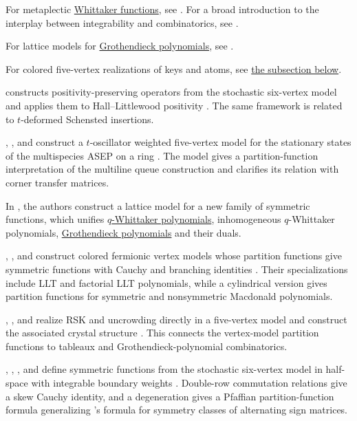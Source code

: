 For metaplectic \hyperref[whittaker]{Whittaker functions}, see
\cite{BrubakerBuciumasBumpGustafsson2020}.
For a broad introduction to the interplay between integrability and
combinatorics, see \cite{ZinnJustin2024x}.

For lattice models for \hyperref[grothendieck]{Grothendieck polynomials}, see
\cite{BrubakerFrechetteHardtTiborWeber2020x,BuciumasScrimshaw2020x}.

For colored five-vertex realizations of keys and atoms, see
\hyperref[latticeModelDemazure]{the subsection below}.

 constructs positivity-preserving operators from the
stochastic six-vertex model and applies them to Hall--Littlewood positivity
\cite{Matveev2023x}.  The same framework is related to $t$-deformed Schensted
insertions.

, , and 
construct a $t$-oscillator weighted five-vertex model for the stationary
states of the multispecies ASEP on a ring \cite{KunibaOkadoScrimshaw2024x}.
The model gives a partition-function interpretation of the multiline queue
construction and clarifies its relation with corner transfer matrices.

In \cite{GunnaWheelerZinnJustin2025x}, the authors construct a lattice model for 
a new family of symmetric functions, which unifies
\hyperref[qWhittaker]{$q$-Whittaker polynomials}, inhomogeneous $q$-Whittaker polynomials,
\hyperref[grothendieck]{Grothendieck polynomials} and their duals.

, , and 
construct colored fermionic vertex models whose partition functions give
symmetric functions with Cauchy and branching identities
\cite{AggarwalBorodinWheeler2021x}.  Their specializations include LLT and
factorial LLT polynomials, while a cylindrical version gives partition
functions for symmetric and nonsymmetric Macdonald polynomials.

, , and 
realize RSK and uncrowding directly in a five-vertex model and construct the
associated crystal structure \cite{JohnstonNguyenSchilling2026x}.  This
connects the vertex-model partition functions to tableaux and
Grothendieck-polynomial combinatorics.

, , , and
 define symmetric functions from the stochastic
six-vertex model in half-space with integrable boundary weights
\cite{GarbaliGierMeadWheeler2024}.  Double-row commutation relations give a
skew Cauchy identity, and a degeneration gives a Pfaffian partition-function
formula generalizing 's formula for symmetry classes of
alternating sign matrices.


